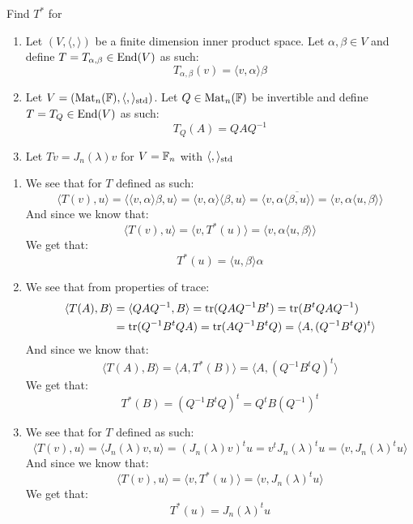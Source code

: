 \documentclass[11pt, a4paper]{article}
\begin{document}
\begin{exercise}
  Find $T^*$ for
  \begin{enumerate}
    \item[(1)] Let $(V,\langle , \rangle)$ be a finite dimension inner product
      space. Let $\alpha,\beta\in V$ and define $T=T_{\alpha,\beta}\in\operatorname{End}(V)$ 
      as such:
      \[
      T_{\alpha,\beta}(v) = \langle v, \alpha \rangle \beta
      \]
    \item[(2)] Let $V = (\operatorname{Mat}_n(\mathbb{F}),\langle,\rangle_{\operatorname{std}})$. 
  Let $Q\in\operatorname{Mat}_n(\mathbb{F})$ be invertible and define $T=T_Q\in\operatorname{End}(V)$ as such:
  \[
  T_Q(A) = QAQ^{-1}
  \]
    \item[(3)] Let $Tv=J_n(\lambda)v$ for $V=\mathbb{F}_n$ with 
  $\langle,\rangle_{\operatorname{std}}$
  \end{enumerate}
\end{exercise}
\begin{solution} \phantom{}
  \begin{enumerate}
    \item[(1)]
  We see that for $T$ defined as such:
  \[
    \langle T(v), u \rangle = 
    \langle \langle v, \alpha \rangle \beta, u \rangle = 
    \langle v, \alpha \rangle \langle \beta, u \rangle = 
    \langle v, \alpha \overline{\langle \beta, u \rangle} \rangle = 
    \langle v, \alpha \langle u, \beta \rangle \rangle
  \]
  And since we know that:
  \[
    \langle T(v), u\rangle = \langle v, T^*(u)\rangle = 
    \langle v, \alpha \langle u, \beta \rangle \rangle
  \]
  We get that:
  \[
    T^*(u) = 
    \langle u, \beta \rangle \alpha
  \]

    \item[(2)]
  We see that from properties of trace:
  \begin{align*}
    \langle T(A), B \rangle &= 
    \langle QAQ^{-1}, B \rangle = \operatorname{tr}(QAQ^{-1}B^{t}) = 
    \operatorname{tr}(B^{t}QAQ^{-1}) \\ &= \operatorname{tr}(Q^{-1}B^{t}QA) = \operatorname{tr}(AQ^{-1}B^{t}Q) = 
    \langle A, (Q^{-1}B^{t}Q)^{t} \rangle
  \end{align*}
  And since we know that:
  \[
    \langle T(A), B\rangle = \langle A, T^*(B)\rangle = 
    \langle A, (Q^{-1}B^{t}Q)^{t} \rangle
  \]
  We get that:
  \[
    T^*(B) = 
    (Q^{-1}B^{t}Q)^{t} = Q^{t}B(Q^{-1})^{t}
  \]

  \item[(3)]
  We see that for $T$ defined as such:
  \[
    \langle T(v), u \rangle = 
    \langle J_n(\lambda)v, u \rangle = (J_n(\lambda)v)^{t} u = 
    v^{t} J_n(\lambda)^{t} u = \langle v, J_n(\lambda)^{t} u \rangle
  \]
  And since we know that:
  \[
    \langle T(v), u\rangle = \langle v, T^*(u)\rangle = 
    \langle v, J_n(\lambda)^{t} u \rangle
  \]
  We get that:
  \[
    T^*(u) = 
    J_n(\lambda)^{t} u
  \]
  \end{enumerate}
\end{solution}
\end{document}
